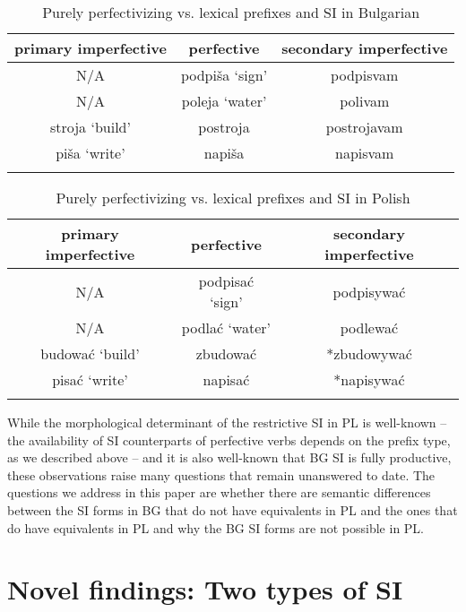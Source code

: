 \documentclass[output=paper,colorlinks,citecolor=brown]{langscibook}
\begin{document}
\begin{table}
\begin{tabular}{ c c c }
  \lsptoprule
primary imperfective & perfective & secondary imperfective \\ 
  \midrule
 N/A & podpiša `sign' & podpisvam \\
 N/A & poleja `water' & polivam \\
 \tablevspace
 stroja ‘build’ & postroja & \cellcolor{gray!15}postrojavam\\
piša ‘write’ & napiša & \cellcolor{gray!15}napisvam \\
  \lspbottomrule
\end{tabular}
\caption{Purely perfectivizing vs. lexical prefixes and SI in Bulgarian}
\label{table:BG}
\end{table}




\begin{table}
\begin{tabular}{ c c c }
  \lsptoprule
primary imperfective & perfective & secondary imperfective \\ 
  \midrule
 N/A & podpisać `sign' & podpisywać \\  
 N/A & podlać `water' & podlewać \\
 \tablevspace
 budować ‘build’ & zbudować & \cellcolor{gray!15}*zbudowywać\\
pisać ‘write’ & napisać & \cellcolor{gray!15}*napisywać \\
\lspbottomrule
\end{tabular}
\caption{Purely perfectivizing vs. lexical prefixes and SI in Polish}
\label{table:PL}
\end{table}



While the morphological determinant of the restrictive SI in PL is well-known -- the availability of SI counterparts of perfective verbs depends on the prefix type, as we described above -- and it is also well-known that BG SI is fully productive, these observations raise many questions that remain unanswered to date. The questions we address in this paper are whether there are semantic differences between the SI forms in BG that do not have equivalents in PL and the ones that do have equivalents in PL and why the BG SI forms are not possible in PL.

\section{Novel findings: Two types of SI}
\end{document}
